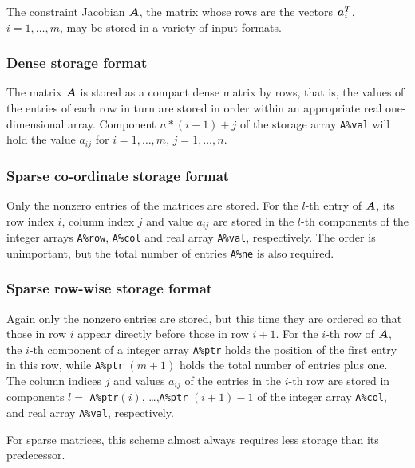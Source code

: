 \documentclass{galahad}
\begin{document}

\galmatrix
The constraint Jacobian ${\bm{A}}$, the matrix
whose rows are the vectors ${\bm{a}}_{i}^{T}$, $i = 1, \ldots , m$,
may be stored in a variety of input formats.

\subsubsection{Dense storage format}\label{dense}
The matrix ${\bm{A}}$ is stored as a compact
dense matrix by rows, that is, the values of the entries of each row in turn
are stored in order within an appropriate real one-dimensional array.
Component $n \ast (i-1) + j$ of the storage array {\tt A\%val} will hold the
value $a_{ij}$ for $i = 1, \ldots , m$, $j = 1, \ldots , n$.

\subsubsection{Sparse co-ordinate storage format}\label{coordinate}
Only the nonzero entries of the matrices are stored. For the
$l$-th entry of ${\bm{A}}$, its row index $i$, column index $j$
and value $a_{ij}$
are stored in the $l$-th components of the integer arrays {\tt A\%row},
{\tt A\%col} and real array {\tt A\%val}, respectively.
The order is unimportant, but the total
number of entries {\tt A\%ne} is also required.

\subsubsection{Sparse row-wise storage format}\label{rowwise}
Again only the nonzero entries are stored, but this time
they are ordered so that those in row $i$ appear directly before those
in row $i+1$. For the $i$-th row of ${\bm{A}}$, the $i$-th component of a
integer array {\tt A\%ptr} holds the position of the first entry in this row,
while {\tt A\%ptr} $(m+1)$ holds the total number of entries plus one.
The column indices $j$ and values $a_{ij}$ of the entries in the $i$-th row
are stored in components
$l =$ {\tt A\%ptr}$(i)$, \ldots ,{\tt A\%ptr} $(i+1)-1$ of the
integer array {\tt A\%col}, and real array {\tt A\%val}, respectively.

For sparse matrices, this scheme almost always requires less storage than
its predecessor.

\end{document}

